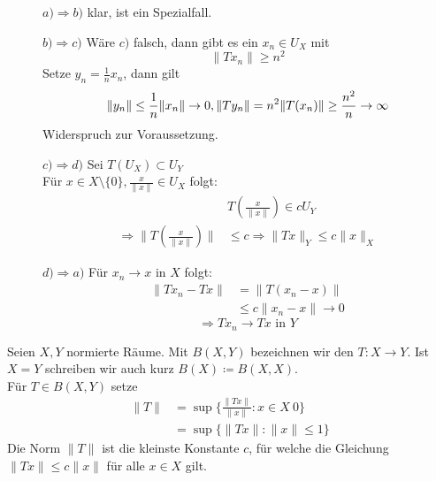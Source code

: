 \begin{beweis}
	\begin{description}
		\item[] $a) \Rightarrow b)$ klar, ist ein Spezialfall.
		\item[] $b) \Rightarrow c)$ Wäre $c)$ falsch, dann gibt es ein $x_{n} \in U_{X}$ mit 
		\[ \| T x_{n} \| \geq n^{2} \]
		Setze $y_{n} = \frac{1}{n} x_{n}$, dann gilt
		\[
			\| y_{n} \| \leq \frac{1}{n} \| x_{n} \| \rightarrow 0, \\
			\| T y_{n} \| = n^{2} \| T(x_{n}) \| \geq \frac{n^2}{n} \rightarrow \infty 
		 \]
		 Widerspruch zur Voraussetzung.
		 \item[] $c) \Rightarrow d)$ Sei $T(U_{X}) \subset U_{Y}$ \\
		 Für $x \in X \setminus \{0\}, \frac{x}{\| x \|} \in U_{X}$ folgt:
		 \begin{align*}
		 	&T \left( \frac{x}{\| x \|} \right) \in c U_{Y} \\
		 	\Rightarrow \| T \left( \frac{x}{\| x \|} \right) \| & \leq c
		 	\Rightarrow \| T x \|_{Y} \leq c \| x \|_{X}			
		 \end{align*}
		 \item[] $d) \Rightarrow a)$ Für $x_{n} \rightarrow x$ in $X$ folgt:
		 \begin{align*}
		 	\| T x_{n} - T x \| & = \| T ( x_{n} - x ) \| \\
		 						& \leq c \| x_{n} - x \| \rightarrow 0
		 \end{align*} \[ \Rightarrow T x_{n} \rightarrow T x \text{ in } Y \]
	\end{description}
\end{beweis}
	
	
\begin{definition}
	Seien $X, Y$ normierte Räume. Mit $B(X, Y)$ bezeichnen wir den  $T: X \rightarrow Y$. Ist $ X = Y$ schreiben wir auch kurz $B(X) \coloneqq B(X, X)$. \\
	
	Für $T \in B(X, Y)$ setze
	\begin{align*}
		\| T \| & = \sup \{ \frac{\| Tx \|}{\| x \|}: x \in X \ {0} \} \\
				& = \sup \{ \| Tx \|: \| x \| \leq 1 \}
	\end{align*}
	Die Norm $\| T \|$ ist die kleinste Konstante $c$, für welche die Gleichung $\| Tx \| \leq c \| x \|$ für alle $x \in X$ gilt.
\end{definition}


